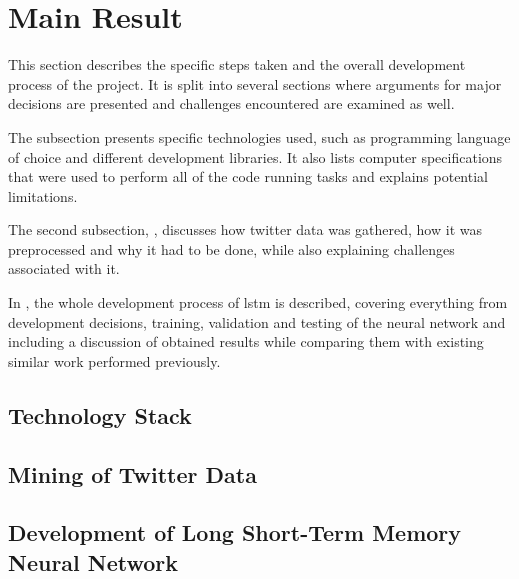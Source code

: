 \section{Main Result}
    This section describes the specific steps taken and the overall development process of the project. It is split into several sections where arguments for major decisions are presented and challenges encountered are examined as well.
    
    The  subsection presents specific technologies used, such as programming language of choice and different development libraries. It also lists computer specifications that were used to perform all of the code running tasks and explains potential limitations.
    
    The second subsection, , discusses how twitter data was gathered, how it was preprocessed and why it had to be done, while also explaining challenges associated with it.
    
    In , the whole development process of \gls{lstm} is described, covering everything from development decisions, training, validation and testing of the neural network and including a discussion of obtained results while comparing them with existing similar work performed previously. 

    \subsection{Technology Stack} \label{techstack}

    \subsection{Mining of Twitter Data} \label{twitterdata}
    
    \subsection{Development of Long Short-Term Memory Neural Network} \label{devlstm}



